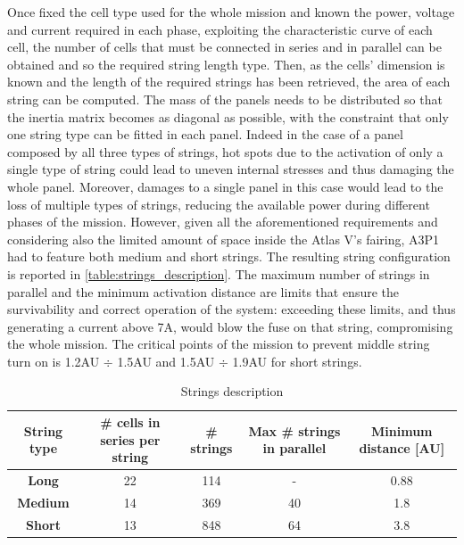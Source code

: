 Once fixed the cell type used for the whole mission and known the power, voltage and current required in each phase, exploiting the characteristic curve of each cell, the number of cells that must be connected in series and in parallel can be obtained and so the required string length type. Then, as the cells' dimension is known and the length of the required strings has been retrieved, the area of each string can be computed. The mass of the panels needs to be distributed so that the inertia matrix becomes as diagonal as possible, with the constraint that only one string type can be fitted in each panel. Indeed in the case of a panel composed by all three types of strings, hot spots due to the activation of only a single type of string could lead to uneven internal stresses and thus damaging the whole panel. Moreover, damages to a single panel in this case would lead to the loss of multiple types of strings, reducing the available power during different phases of the mission.  However, given all the aforementioned requirements and considering also the limited amount of space inside the Atlas V's fairing, A3P1 had to feature both medium and short strings. The resulting string configuration is reported in \autoref{table:strings_description}. The maximum number of strings in parallel and the minimum activation distance are limits that ensure the survivability and correct operation of the system: exceeding these limits, and thus generating a current above 7A, would blow the fuse on that string, compromising the whole mission. The critical points of the mission to prevent middle string turn on is 1.2AU $\div$ 1.5AU and 1.5AU $\div$ 1.9AU for short strings.

 \begin{table}[H]
    \renewcommand{\arraystretch}{1.3}
    \centering
\begin{tabular}{|c|c|c|c|c|}
    \hline
    \textbf{String type} & \textbf{\# cells in series per string} & \textbf{\# strings} & \textbf{Max \# strings in parallel} & \textbf{Minimum distance [AU]}\\
    \hline
    \hline
    \textbf{Long}    &  22 & 114 & - & 0.88 \\
    \hline
    \textbf{Medium}  &  14 & 369 & 40 & 1.8\\
    \hline
    \textbf{Short}   &  13 & 848 & 64 & 3.8 \\
    \hline
\end{tabular}
\caption{Strings description}
\label{table:strings_description}
\end{table}

